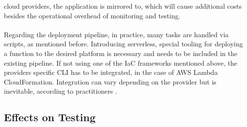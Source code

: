 \documentclass[11pt]{article}
\begin{document}
cloud providers, the application is mirrored to, which will cause additional costs besides the operational overhead of monitoring and testing.\\\\ Regarding the deployment pipeline, in practice, many tasks are handled via scripts, as mentioned before. Introducing serverless, special tooling for deploying a function to the desired platform is necessary and needs to be included in the existing pipeline. If not using one of the IaC frameworks mentioned above, the providers specific CLI has to be integrated, in the case of AWS Lambda CloudFormation. Integration can vary depending on the provider but is inevitable, according to practitioners \cite{ivanov2018implementation}.
\subsection{Effects on Testing}
\end{document}
